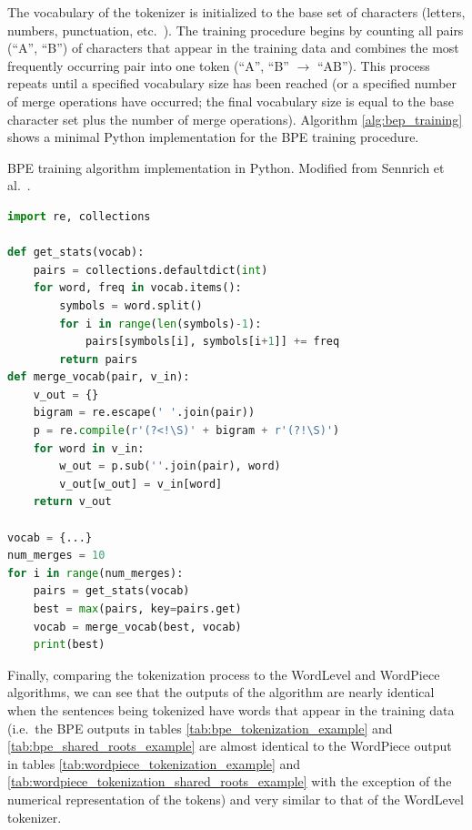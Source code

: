 \documentclass[12pt]{article}
\begin{document}
The vocabulary of the tokenizer is initialized to the base set of characters (letters, numbers, punctuation, etc.~). The training procedure begins by
counting all pairs (``A'', ``B'') of characters that appear in the training data and combines the most frequently occurring pair into one token
(``A'', ``B'' $\rightarrow$ ``AB''). This process repeats until a specified vocabulary size has been reached (or a specified number of merge
operations have occurred; the final vocabulary size is equal to the base character set plus the number of merge operations). Algorithm
\ref{alg:bep_training} shows a minimal Python implementation for the BPE training procedure.

\begin{algorithm}[h!]
    \caption{BPE training algorithm implementation in Python. Modified from Sennrich et al.~\cite{sennrich_neural_2016}.}
    \label{alg:bep_training}
    \begin{lstlisting}[language=Python]
import re, collections

def get_stats(vocab):
    pairs = collections.defaultdict(int)
    for word, freq in vocab.items():
        symbols = word.split()
        for i in range(len(symbols)-1):
            pairs[symbols[i], symbols[i+1]] += freq
        return pairs
def merge_vocab(pair, v_in):
    v_out = {}
    bigram = re.escape(' '.join(pair))
    p = re.compile(r'(?<!\S)' + bigram + r'(?!\S)')
    for word in v_in:
        w_out = p.sub(''.join(pair), word)
        v_out[w_out] = v_in[word]
    return v_out

vocab = {...}
num_merges = 10
for i in range(num_merges):
    pairs = get_stats(vocab)
    best = max(pairs, key=pairs.get)
    vocab = merge_vocab(best, vocab)
    print(best)
    \end{lstlisting}
\end{algorithm}

Finally, comparing the tokenization process to the WordLevel and WordPiece algorithms, we can see that the outputs of the algorithm are nearly
identical when the sentences being tokenized have words that appear in the training data (i.e.~the BPE outputs in tables
\ref{tab:bpe_tokenization_example} and \ref{tab:bpe_shared_roots_example} are almost identical to the WordPiece output in tables
\ref{tab:wordpiece_tokenization_example} and \ref{tab:wordpiece_tokenization_shared_roots_example} with the exception of the numerical representation
of the tokens) and very similar to that of the WordLevel tokenizer.
\end{document}
